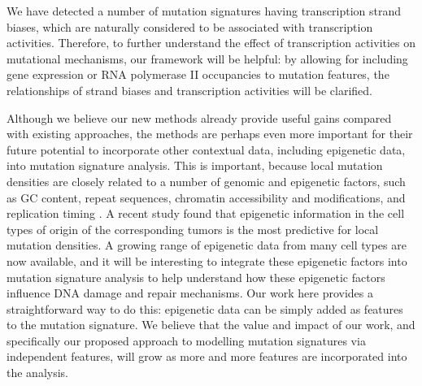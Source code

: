 \documentclass[10pt,letterpaper]{article}
\begin{document}
We have detected a number of mutation signatures having transcription strand biases, 
which are naturally considered to be associated with transcription activities.
Therefore, to further understand the effect of transcription activities on mutational mechanisms, 
our framework will be helpful: by allowing for including gene expression or RNA polymerase II occupancies 
to mutation features, the relationships of strand biases and transcription activities will be clarified.


Although we believe our new methods already provide
useful gains compared with existing approaches,
the methods are perhaps even more important for their future potential to incorporate other contextual data, including epigenetic data,
into mutation signature analysis. This is important, because
local mutation densities are closely related to a number of genomic and epigenetic factors, such as GC content, repeat sequences, chromatin accessibility and modifications, and replication timing \cite{pmid22820252, pmid21953857, pmid23422670, pmid23770567}.
A recent study found that epigenetic information in the cell types of origin of the corresponding tumors is the most predictive \cite{pmid25693567} for local mutation densities. A growing range of epigenetic data from many cell types are now available, and it will be interesting to integrate these epigenetic factors into mutation signature analysis to help understand how these epigenetic factors influence DNA damage and repair mechanisms. 
Our work here provides a straightforward way to do this: epigenetic
data can be simply added as features
to the mutation signature. 
We believe that 
the value and impact of our work, and 
specifically our proposed approach to modelling mutation signatures via independent features, will grow as more and more features
are incorporated into the analysis.







\end{document}
